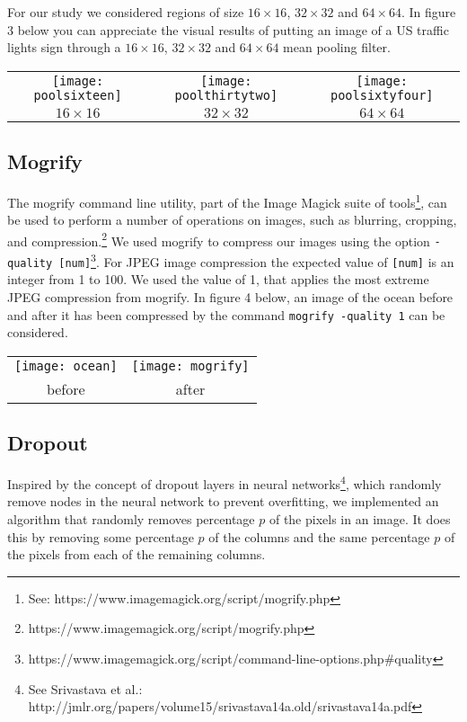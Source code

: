 \documentclass[letterpaper, 10 pt, conference]{ieeeconf}  %
\begin{document}
For our study we considered regions of size $16 \times 16$, $32 \times 32$ and $64 \times 64$.
In figure 3 below you can appreciate the visual results of putting an image of a US traffic lights sign through a $16 \times 16$,
$32 \times 32$ and $64 \times 64$ mean pooling filter.

\vspace*{3mm}
\begin{tabular}{c c c}
	\texttt{[image: poolsixteen]} &
		\texttt{[image: poolthirtytwo]} &
		\texttt{[image: poolsixtyfour]} \\
	$16 \times 16$ & $32 \times 32$ & $64 \times 64$ \\
\end{tabular}

\vspace*{3mm}

\subsection{Mogrify}
The mogrify command line utility, part of the Image Magick suite of tools\footnote{See: https://www.imagemagick.org/script/mogrify.php}, can be used to perform a number of operations
on images, such as blurring, cropping, and compression.\footnote{https://www.imagemagick.org/script/mogrify.php}
We used mogrify to compress our images using the option {\tt -quality [num]}\footnote{https://www.imagemagick.org/script/command-line-options.php\#quality}. For JPEG image compression the expected value of {\tt [num]} is an integer from 1 to 100. We used the value of 1, that applies the most extreme JPEG compression from mogrify.
In figure 4 below, an image of the ocean before and after it has been compressed by the command {\tt mogrify -quality 1} can be considered.

\vspace*{3mm}
\begin{tabular}{c c}
	\texttt{[image: ocean]} &
		\texttt{[image: mogrify]} \\
	before & after \\
\end{tabular}
\vspace*{3mm}

\subsection{Dropout}
Inspired by the concept of dropout layers in neural networks\footnote{See Srivastava et al.: http://jmlr.org/papers/volume15/srivastava14a.old/srivastava14a.pdf},
which randomly remove nodes in the neural network
to prevent overfitting, we implemented an algorithm
that randomly removes percentage $p$ of the pixels
in an image. It does this by removing
some percentage $p$ of the columns and the same percentage $p$ of the pixels
from each of the remaining columns.
\end{document}
